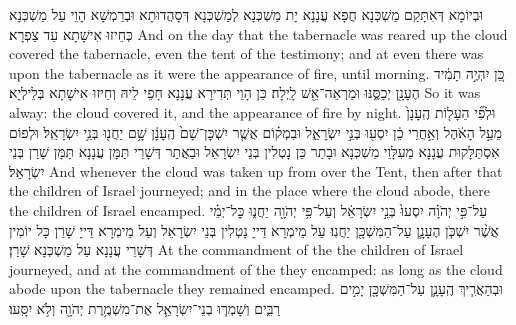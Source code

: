 {וּבְיוֹמָא דְּאִתָּקַם מַשְׁכְּנָא חֲפָא עֲנָנָא יָת מַשְׁכְּנָא לְמַשְׁכְּנָא דְּסָהֲדוּתָא וּבְרַמְשָׁא הָוֵי עַל מַשְׁכְּנָא כְּחֵיזוּ אִישָׁתָא עַד צַפְרָא׃}
{And on the day that the tabernacle was reared up the cloud covered the tabernacle, even the tent of the testimony; and at even there was upon the tabernacle as it were the appearance of fire, until morning.}{}
{כֵּ֚ן יִהְיֶ֣ה תָמִ֔יד הֶעָנָ֖ן יְכַסֶּ֑נּוּ וּמַרְאֵה־אֵ֖שׁ לָֽיְלָה׃}
{כֵּן הָוֵי תְּדִירָא עֲנָנָא חָפֵי לֵיהּ וְחֵיזוּ אִישָׁתָא בְּלֵילְיָא׃}
{So it was alway: the cloud covered it, and the appearance of fire by night.}{}
{וּלְפִ֞י הֵעָל֤וֹת הֶֽעָנָן֙ מֵעַ֣ל הָאֹ֔הֶל וְאַ֣חֲרֵי כֵ֔ן יִסְע֖וּ בְּנֵ֣י יִשְׂרָאֵ֑ל וּבִמְק֗וֹם אֲשֶׁ֤ר יִשְׁכׇּן־שָׁם֙ הֶֽעָנָ֔ן שָׁ֥ם יַחֲנ֖וּ בְּנֵ֥י יִשְׂרָאֵֽל׃
}
{וּלְפוֹם אִסְתַּלָּקוּת עֲנָנָא מֵעִלָּוֵי מַשְׁכְּנָא וּבָתַר כֵּן נָטְלִין בְּנֵי יִשְׂרָאֵל וּבַאֲתַר דְּשָׁרֵי תַּמָּן עֲנָנָא תַּמָּן שָׁרַן בְּנֵי יִשְׂרָאֵל׃}
{And whenever the cloud was taken up from over the Tent, then after that the children of Israel journeyed; and in the place where the cloud abode, there the children of Israel encamped.}{}
{עַל־פִּ֣י יְהֹוָ֗ה יִסְעוּ֙ בְּנֵ֣י יִשְׂרָאֵ֔ל וְעַל־פִּ֥י יְהֹוָ֖ה יַחֲנ֑וּ כׇּל־יְמֵ֗י אֲשֶׁ֨ר יִשְׁכֹּ֧ן הֶעָנָ֛ן עַל־הַמִּשְׁכָּ֖ן יַחֲנֽוּ׃
}
{עַל מֵימְרָא דַּייָ נָטְלִין בְּנֵי יִשְׂרָאֵל וְעַל מֵימְרָא דַּייָ שָׁרַן כָּל יוֹמִין דְּשָׁרֵי עֲנָנָא עַל מַשְׁכְּנָא שָׁרַן׃}
{At the commandment of the \lord\space the children of Israel journeyed, and at the commandment of the \lord\space they encamped: as long as the cloud abode upon the tabernacle they remained encamped.}{}
{וּבְהַאֲרִ֧יךְ הֶֽעָנָ֛ן עַל־הַמִּשְׁכָּ֖ן יָמִ֣ים רַבִּ֑ים וְשָׁמְר֧וּ בְנֵי־יִשְׂרָאֵ֛ל אֶת־מִשְׁמֶ֥רֶת יְהֹוָ֖ה וְלֹ֥א יִסָּֽעוּ׃}
